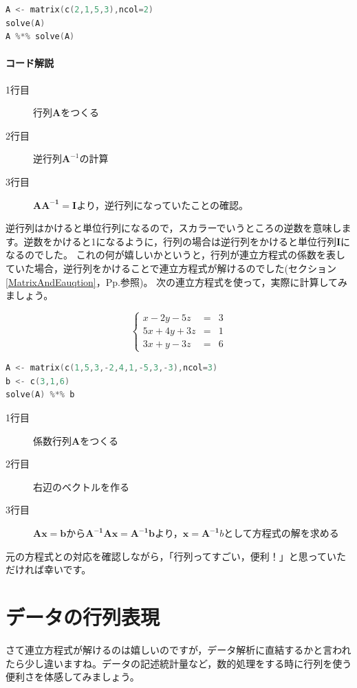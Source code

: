 \documentclass{ltjsbook}
\begin{document}
\begin{lstlisting}[language=c++,label={code:09_05},caption={逆行列の計算}]
A <- matrix(c(2,1,5,3),ncol=2)
solve(A)
A %*% solve(A)
\end{lstlisting}
\paragraph{コード解説}
\begin{description}
	\item[1行目] 行列$\bm{A}$をつくる
	\item[2行目] 逆行列$\bm{A}^{-1}$の計算
	\item[3行目] $\bm{AA^{-1}}=\bm{I}$より，逆行列になっていたことの確認。
\end{description}

逆行列はかけると単位行列になるので，スカラーでいうところの逆数を意味します。逆数をかけると1になるように，行列の場合は逆行列をかけると単位行列$\bm{I}$になるのでした。
これの何が嬉しいかというと，行列が連立方程式の係数を表していた場合，逆行列をかけることで連立方程式が解けるのでした(セクション\ref{MatrixAndEauqtion}，Pp.\pageref{MatrixAndEauqtion}参照)。
次の連立方程式を使って，実際に計算してみましょう。

\[
	\left \{
	\begin{array}{lcl}
		x-2y-5z  & = & 3 \\
		5x+4y+3z & = & 1 \\
		3x+y-3z  & = & 6
	\end{array}
	\right .
\]

\begin{lstlisting}[language=c++,label={code:09_06},caption={連立方程式を解く}]
A <- matrix(c(1,5,3,-2,4,1,-5,3,-3),ncol=3)
b <- c(3,1,6)
solve(A) %*% b
\end{lstlisting}
\begin{description}
	\item[1行目] 係数行列$\bm{A}$をつくる
	\item[2行目] 右辺のベクトルを作る
	\item[3行目] $\bm{Ax}=\bm{b}$から$\bm{A^{-1}Ax}=\bm{A^{-1}b}$より，$\bm{x}=\bm{A^{-1}}b$として方程式の解を求める
\end{description}

元の方程式との対応を確認しながら，「行列ってすごい，便利！」と思っていただければ幸いです。

\section{データの行列表現}
さて連立方程式が解けるのは嬉しいのですが，データ解析に直結するかと言われたら少し違いますね。データの記述統計量など，数的処理をする時に行列を使う便利さを体感してみましょう。
\end{document}
